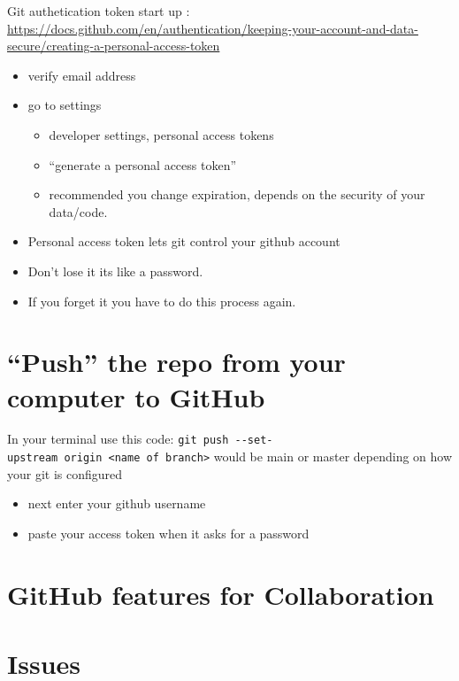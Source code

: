 \documentclass[]{article}
\providecommand{\tightlist}{%
  \setlength{\itemsep}{0pt}\setlength{\parskip}{0pt}}
\begin{document}
Git authetication token start up :
\url{https://docs.github.com/en/authentication/keeping-your-account-and-data-secure/creating-a-personal-access-token}

\begin{itemize}
\tightlist
\item
  verify email address
\item
  go to settings

  \begin{itemize}
  \tightlist
  \item
    developer settings, personal access tokens
  \item
    ``generate a personal access token''
  \item
    recommended you change expiration, depends on the security of your
    data/code.
  \end{itemize}
\item
  Personal access token lets git control your github account
\item
  Don't lose it its like a password.
\item
  If you forget it you have to do this process again.
\end{itemize}

\section{\texorpdfstring{``Push'' the repo from your computer to
GitHub}{Push the repo from your computer to GitHub}}\label{push-the-repo-from-your-computer-to-github}

In your terminal use this code:
\texttt{git\ push\ -\/-set-upstream\ origin\ \textless{}name\ of\ branch\textgreater{}}
would be main or master depending on how your git is configured

\begin{itemize}
\tightlist
\item
  next enter your github username
\item
  paste your access token when it asks for a password
\end{itemize}

\section{GitHub features for
Collaboration}\label{github-features-for-collaboration}

\section{Issues}\label{issues}
\end{document}
